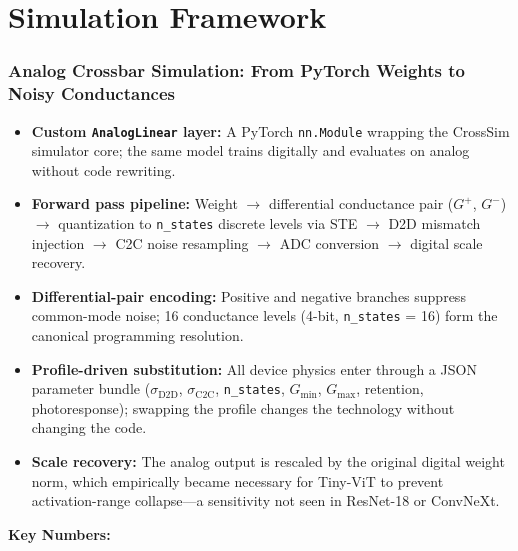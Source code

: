 \documentclass[aspectratio=169,11pt]{beamer}
\begin{document}

\section{Simulation Framework}
\begin{frame}
  \frametitle{Analog Crossbar Simulation: From PyTorch Weights to Noisy Conductances}
  \begin{itemize}
    \item \textbf{Custom \texttt{AnalogLinear} layer:} A PyTorch \texttt{nn.Module} wrapping the CrossSim simulator core; the same model trains digitally and evaluates on analog without code rewriting.
    \item \textbf{Forward pass pipeline:} Weight $\rightarrow$ differential conductance pair ($G^+$, $G^-$) $\rightarrow$ quantization to \texttt{n\_states} discrete levels via STE $\rightarrow$ D2D mismatch injection $\rightarrow$ C2C noise resampling $\rightarrow$ ADC conversion $\rightarrow$ digital scale recovery.
    \item \textbf{Differential-pair encoding:} Positive and negative branches suppress common-mode noise; 16 conductance levels (4-bit, \texttt{n\_states} = 16) form the canonical programming resolution.
    \item \textbf{Profile-driven substitution:} All device physics enter through a JSON parameter bundle ($\sigma_\text{D2D}$, $\sigma_\text{C2C}$, \texttt{n\_states}, $G_\text{min}$, $G_\text{max}$, retention, photoresponse); swapping the profile changes the technology without changing the code.
    \item \textbf{Scale recovery:} The analog output is rescaled by the original digital weight norm, which empirically became necessary for Tiny-ViT to prevent activation-range collapse---a sensitivity not seen in ResNet-18 or ConvNeXt.
  \end{itemize}
  \vfill
  \textbf{Key Numbers:}
  \begin{itemize}

\end{itemize}
\end{frame}
\end{document}
